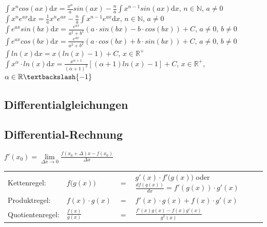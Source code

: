 	$\int x^n cos(ax) \mathrm dx = \frac{x^n}{a} sin(ax) - \frac{n}{a} \int
	x^{n-1} sin(ax) \mathrm dx$, $n \in \mathbb N$, $a \neq 0$\\
	$\int x^n e^{ax} \mathrm dx = \frac{1}{a} x^n e^{ax} - \frac{n}{a} \int
	x^{n-1} e^{ax} \mathrm dx$, $n \in \mathbb N$, $a \neq 0$\\
	$\int e^{ax} sin(bx) \mathrm dx = \frac{e^{ax}}{a^2 + b^2} (a \cdot sin(bx) -
	b \cdot cos(bx)) + C$, $a \neq 0$, $b \neq 0$ \\
	$\int e^{ax} cos(bx) \mathrm dx = \frac{e^{ax}}{a^2 + b^2} (a \cdot cos(bx) +
	b \cdot sin(bx)) + C$, $a \neq 0$, $b \neq 0$ \\
	$\int ln(x) \mathrm dx = x(ln(x) - 1) + C$, $x \in \mathbb R^+$\\
	$\int x^\alpha \cdot ln(x) \mathrm dx = \frac{x^{\alpha + 1}}{(\alpha + 1)^2}
	[(\alpha + 1) ln(x) - 1] + C$, $x \in \mathbb R^+$, $\alpha \in \mathbb R
	\textbackslash \{-1\}$\\
	
			
	\subsection{Differentialgleichungen}
		
	\subsection{Differential-Rechnung}
	  $f'(x_0)=\lim\limits_{\Delta x\rightarrow 0}
	  \frac{f(x_0+\Delta)x-f(x_0)}{\Delta x}$\\
		\begin{tabular}{llll}
			Kettenregel:	& $f\big(g(x)\big)$ &$=$ & $g'(x)\cdot f'\big(g(x)\big)$
			oder $\frac{d f(g(x))}{dx} = f'(g(x)) \cdot g'(x)$\\[0.1cm] Produktregel:	&
			$f(x)\cdot g(x)$ &$=$ & $f'(x)\cdot g(x) + f(x)\cdot g'(x)$\\[0.1cm] Quotientenregel:& $\frac{f(x)}{g(x)}$ &$=$ & $\frac{f'(x)g(x)-f(x)g'(x)}{g^2(x)}$\\
		\end{tabular}
		
